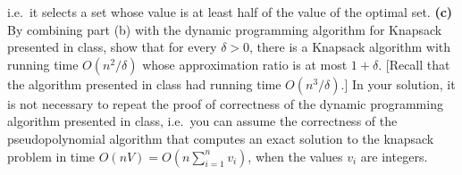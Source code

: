 \documentclass[11pt]{article}
\def\gap{0.1in}
\def\bigap{0.25in}
\begin{document}
i.e.\ it selects a set whose value is at least half
of the value of the optimal set.
\vskip \gap
{\bf (c)}
By combining part (b) with the dynamic programming
algorithm for Knapsack presented in class, show that
for every $\delta>0$, there is a Knapsack algorithm
with running time $O(n^2 / \delta)$ whose
approximation ratio is at most $1+\delta.$
[Recall that the algorithm presented in class
had running time $O(n^3  / \delta).$]
In your solution, it is not necessary to repeat 
the proof of correctness of the dynamic
programming algorithm presented in class,
i.e.~you can assume the correctness of 
the pseudopolynomial algorithm that computes
an exact solution to the knapsack problem 
in time $O(n V) = O(n \sum_{i=1}^n v_i)$,
when the values $v_i$ are integers.



\vskip \bigap

\end{document}
